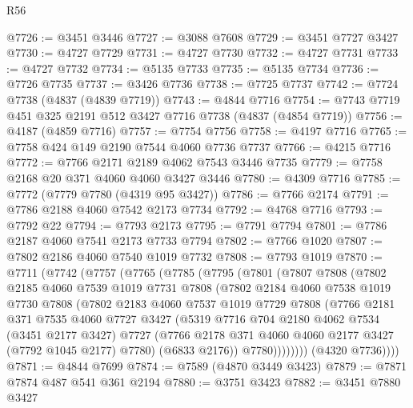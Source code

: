 \begin{lexlean}{R56}
\begin{coremodule}
@7726 := @3451 @3446
@7727 := @3088 @7608
@7729 := @3451 @7727 @3427
@7730 := @4727 @7729
@7731 := @4727 @7730
@7732 := @4727 @7731
@7733 := @4727 @7732
@7734 := @5135 @7733
@7735 := @5135 @7734
@7736 := @7726 @7735
@7737 := @3426 @7736
@7738 := @7725 @7737
@7742 := @7724 @7738 (@4837 (@4839 @7719))
@7743 := @4844 @7716
@7754 := @7743 @7719 @451 @325 @2191 @512 @3427 @7716 @7738 (@4837 (@4854 @7719))
@7756 := @4187 (@4859 @7716)
@7757 := @7754 @7756
@7758 := @4197 @7716
@7765 := @7758 @424 @149 @2190 @7544 @4060 @7736 @7737
@7766 := @4215 @7716
@7772 := @7766 @2171 @2189 @4062 @7543 @3446 @7735
@7779 := @7758 @2168 @20 @371 @4060 @4060 @3427 @3446
@7780 := @4309 @7716
@7785 := @7772 (@7779 @7780 (@4319 @95 @3427))
@7786 := @7766 @2174
@7791 := @7786 @2188 @4060 @7542 @2173 @7734
@7792 := @4768 @7716
@7793 := @7792 @22
@7794 := @7793 @2173
@7795 := @7791 @7794
@7801 := @7786 @2187 @4060 @7541 @2173 @7733 @7794
@7802 := @7766 @1020
@7807 := @7802 @2186 @4060 @7540 @1019 @7732
@7808 := @7793 @1019
@7870 := @7711
    (@7742
      (@7757
        (@7765
          (@7785
            (@7795
              (@7801
                (@7807
                  @7808
                  (@7802
                    @2185
                    @4060
                    @7539
                    @1019
                    @7731
                    @7808
                    (@7802
                      @2184
                      @4060
                      @7538
                      @1019
                      @7730
                      @7808
                      (@7802
                        @2183
                        @4060
                        @7537
                        @1019
                        @7729
                        @7808
                        (@7766
                          @2181
                          @371
                          @7535
                          @4060
                          @7727
                          @3427
                          (@5319
                            @7716
                            @704
                            @2180
                            @4062
                            @7534
                            (@3451 @2177 @3427)
                            @7727
                            (@7766 @2178 @371 @4060 @4060 @2177 @3427 (@7792 @1045 @2177) @7780)
                            (@6833 @2176))
                          @7780))))))))
          (@4320 @7736))))
@7871 := @4844 @7699
@7874 := @7589 (@4870 @3449 @3423)
@7879 := @7871 @7874 @487 @541 @361 @2194
@7880 := @3751 @3423
@7882 := @3451 @7880 @3427

\end{coremodule}
\end{lexlean}
